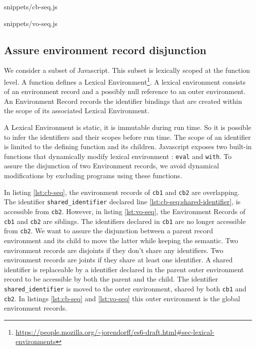              {snippets/cb-seq.js}

             {snippets/vo-seq.js}

\subsection{Assure environment record disjunction} \label{section:disjunction}

We consider a subset of Javascript.
This subset is lexically scoped at the function level.
A function defines a Lexical Environment\footnote{\url{https://people.mozilla.org/~jorendorff/es6-draft.html\#sec-lexical-environments}}.
A lexical environment consists of an environment record and a possibly null reference to an outer environment.
An Environment Record records the identifier bindings that are created within the scope of its associated Lexical Environment.

A Lexical Environment is static, it is immutable during run time.
So it is possible to infer the identifiers and their scopes before run time.
The scope of an identifier is limited to the defining function and its children.
Javascript exposes two built-in functions that dynamically modify lexical environment : \texttt{eval} and \texttt{with}.
To assure the disjunction of two Environment records, we avoid dynamical modifications by excluding programs using these functions.

In listing \ref{lst:cb-seq}, the environment records of \texttt{cb1} and \texttt{cb2} are overlapping.
The identifier \texttt{shared_identifier} declared line \ref{lst:cb-seq:shared-identifier}, is accessible from \texttt{cb2}.
However, in listing \ref{lst:vo-seq}, the Environment Records of \texttt{cb1} and \texttt{cb2} are siblings.
The identifiers declared in \texttt{cb1} are no longer accessible from \texttt{cb2}.
We want to assure the disjunction between a parent record environment and its child to move the latter while keeping the semantic.
Two environment records are disjoints if they don't share any identifiers.
Two environment records are joints if they share at least one identifier.
A shared identifier is replaceable by a identifier declared in the parent outer environment record to be accessible by both the parent and the child.
The identifier \texttt{shared_identifier} is moved to the outer environment, shared by both \texttt{cb1} and \texttt{cb2}.
In listings \ref{lst:cb-seq} and \ref{lst:vo-seq} this outer environment is the global environment records.

